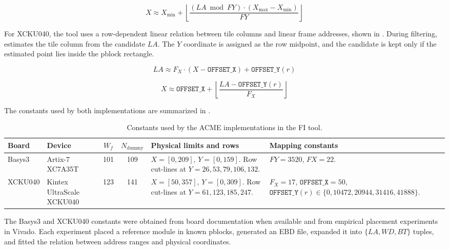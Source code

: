 \begin{equation}
  X \approx X_{\min} + \left\lfloor \frac{(LA \bmod FY)\cdot (X_{\max}-X_{\min})}{FY} \right\rfloor
  \label{eq:basys3_x_from_la}
\end{equation}

For XCKU040, the tool uses a row-dependent linear relation between tile columns and linear frame addresses, shown in . During filtering,  estimates the tile column from the candidate \(LA\). The \(Y\) coordinate is assigned as the row midpoint, and the candidate is kept only if the estimated point lies inside the pblock rectangle.

\begin{equation}
LA \approx F_X\cdot (X-\texttt{OFFSET\_X}) + \texttt{OFFSET\_Y}(r)
\label{eq:xcku40_la_from_x}
\end{equation}

\begin{equation}
X \approx \texttt{OFFSET\_X} + \left\lfloor \frac{LA-\texttt{OFFSET\_Y}(r)}{F_X} \right\rfloor
\label{eq:xcku40_x_from_la}
\end{equation}

The constants used by both implementations are summarized in .

\begin{table}[h]
\centering
\small
\setlength{\tabcolsep}{3pt}
\renewcommand{\arraystretch}{1.2}
\begin{tabularx}{\textwidth}{|l|X|c|c|X|X|}
\hline
\rowcolor{tableheader}\textbf{Board} & \textbf{Device} & \textbf{\(W_f\)} & \textbf{\(N_\text{dummy}\)} & \textbf{Physical limits and rows} & \textbf{Mapping constants} \\
\hline
\hline
Basys3 & Artix-7 XC7A35T & 101 & 109 & \(X=[0,209]\), \(Y=[0,159]\). Row cut-lines at \(Y=26,53,79,106,132\). & \(FY=3520\), \(FX=22\). \\
\hline
XCKU040 & Kintex UltraScale XCKU040 & 123 & 141 & \(X=[50,357]\), \(Y=[0,309]\). Row cut-lines at \(Y=61,123,185,247\). & \(F_X=17\), \(\texttt{OFFSET\_X}=50\), \(\texttt{OFFSET\_Y}(r)\in\{0,10472,20944,31416,41888\}\). \\
\hline
\end{tabularx}
\caption{Constants used by the \ac{ACME} implementations in the \ac{FI} tool.}
\label{tab:chap8_acme_constants}
\end{table}

The Basys3 and XCKU040 constants were obtained from board documentation when available and from empirical placement experiments in Vivado. Each experiment placed a reference module in known pblocks, generated an \ac{EBD} file, expanded it into \(\{LA,WD,BT\}\) tuples, and fitted the relation between address ranges and physical coordinates.





